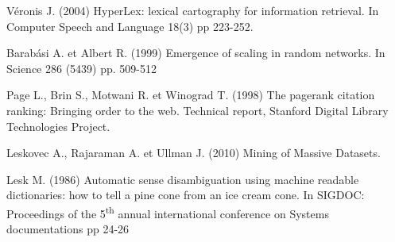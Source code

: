 \begin{thebibliography}{10}
Véronis J. (2004)
HyperLex: lexical cartography for information retrieval.
In Computer Speech and Language 18(3) pp 223-252. \label{bib:veronis} 

Barabási A. et Albert R. (1999)
Emergence of scaling in random networks.
In Science 286 (5439) pp. 509-512 \label{bib:barabasi}

Page L., Brin S., Motwani R. et Winograd T. (1998)
The pagerank citation ranking: Bringing order to the web.
Technical report, Stanford Digital Library Technologies Project.
\label{bib:pagerank}

Leskovec A., Rajaraman A. et Ullman J. (2010)
Mining of Massive Datasets.
\label{bib:linkanalysis}

Lesk M. (1986)
Automatic sense disambiguation using machine readable dictionaries:
how to tell a pine cone from an ice cream cone.
In SIGDOC: Proceedings of the 5\textsuperscript{th} annual international
conference on Systems documentations pp 24-26 
\label{bib:lesk}

\end{thebibliography}

